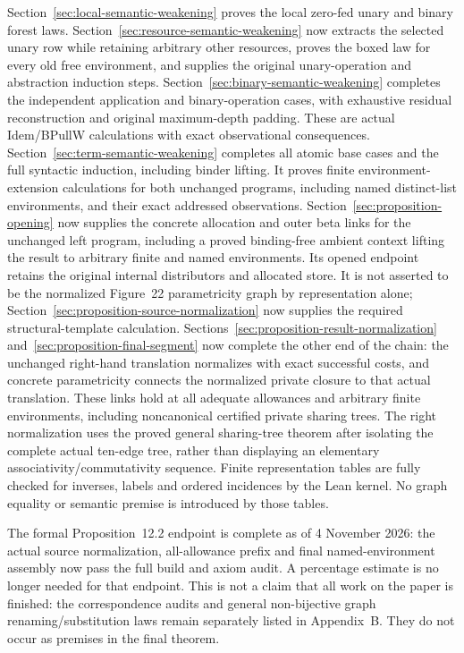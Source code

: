 Section~\ref{sec:local-semantic-weakening} proves the local zero-fed unary
and binary forest laws. Section~\ref{sec:resource-semantic-weakening} now
extracts the selected unary row while retaining arbitrary other resources,
proves the boxed law for every old free environment, and supplies the original
unary-operation and abstraction induction steps. Section~\ref{sec:binary-semantic-weakening} completes the independent
application and binary-operation cases, with exhaustive residual reconstruction
and original maximum-depth padding. These are actual Idem/BPullW calculations
with exact observational consequences. Section~\ref{sec:term-semantic-weakening}
completes all atomic base cases and the full syntactic induction, including
binder lifting. It proves finite environment-extension calculations for both
unchanged programs, including named distinct-list environments, and their
exact addressed observations. Section~\ref{sec:proposition-opening} now supplies the concrete allocation
and outer beta links for the unchanged left program, including a proved
binding-free ambient context lifting the result to arbitrary finite and named
environments. Its opened endpoint retains the original internal distributors
and allocated store. It is not asserted to be the normalized Figure~22
parametricity graph by representation alone; Section~\ref{sec:proposition-source-normalization} now supplies the required structural-template calculation.
Sections~\ref{sec:proposition-result-normalization} and~\ref{sec:proposition-final-segment}
now complete the other end of the chain: the unchanged right-hand translation
normalizes with exact successful costs, and concrete parametricity connects
the normalized private closure to that actual translation. These links hold
at all adequate allowances and arbitrary finite environments, including
noncanonical certified private sharing trees. The right normalization uses
the proved general sharing-tree theorem after isolating the complete actual
ten-edge tree, rather than displaying an elementary associativity/commutativity
sequence. Finite representation tables are fully checked for inverses, labels
and ordered incidences by the Lean kernel. No graph equality or semantic
premise is introduced by those tables.

The formal Proposition~12.2 endpoint is complete as of 4 November 2026:
the actual source normalization, all-allowance prefix and final named-environment
assembly now pass the full build and axiom audit. A percentage estimate is no
longer needed for that endpoint. This is not a claim that all work on the
paper is finished: the correspondence audits and general non-bijective graph
renaming/substitution laws remain separately listed in Appendix~B. They do
not occur as premises in the final theorem.

